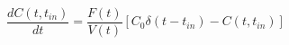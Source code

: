 \begin{equation}
\frac{dC(t,t_{in})}{dt} = \frac{F(t)}{V(t)}[C_0\delta(t-t_{in})-C(t,t_{in})]
\end{equation}